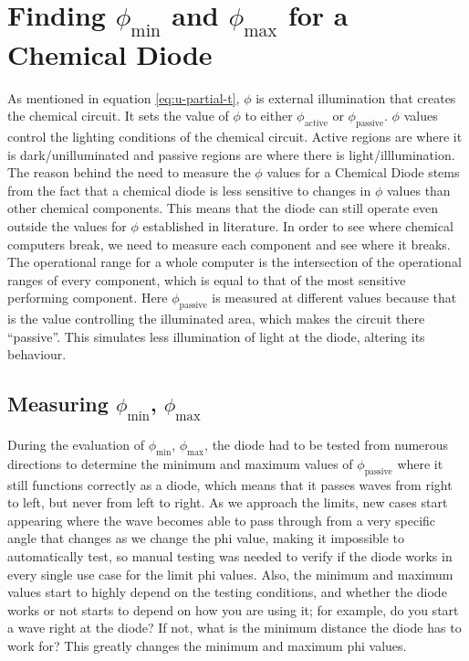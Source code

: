 \section{Finding $\phi_{\text{min}}$ and $\phi_{\text{max}}$ for a Chemical Diode} \label{sec:finding-phi-min-max}
As mentioned in equation \ref{eq:u-partial-t}, $\phi$ is external illumination that creates the chemical circuit. It sets the value of $\phi$ to either $\phi_{\text{active}}$ or $\phi_{\text{passive}}$. 
$\phi$ values control the lighting conditions of the chemical circuit.
Active regions are where it is dark/unilluminated and passive regions are where there is light/illlumination.
The reason behind the need to measure the $\phi$ values for a Chemical Diode stems from the fact that a chemical diode is less sensitive to changes in $\phi$ values than other chemical components.
This means that the diode can still operate even outside the values for $\phi$ established in literature. In order to see where chemical computers break, we need to measure each component and see where it breaks.
The operational range for a whole computer is the intersection of the operational ranges of every component, which is equal to that of the most sensitive performing component.
Here $\phi_{\text{passive}}$ is measured at different values because that is the value controlling the illuminated area, which makes the circuit there ``passive''. This simulates less illumination of light at the diode, altering its behaviour.
\subsection{Measuring $\phi_{\text{min}}$, $\phi_{\text{max}}$}


During the evaluation of $\phi_{\text{min}}$, $\phi_{\text{max}}$, the diode had to be tested from numerous directions to determine the minimum and maximum values of $\phi_{\text{passive}}$ where it still functions correctly as a diode, 
which means that it passes waves from right to left, but never from left to right. As we approach the limits, new cases start appearing where the wave becomes able to pass through from a very specific angle that changes as we change the phi value, 
making it impossible to automatically test, so manual testing was needed to verify if the diode works in every single use case for the limit phi values. Also, the minimum and maximum values start to highly depend on the testing conditions, 
and whether the diode works or not starts to depend on how you are using it; for example, do you start a wave right at the diode? 
If not, what is the minimum distance the diode has to work for? This greatly changes the minimum and maximum phi values. 
